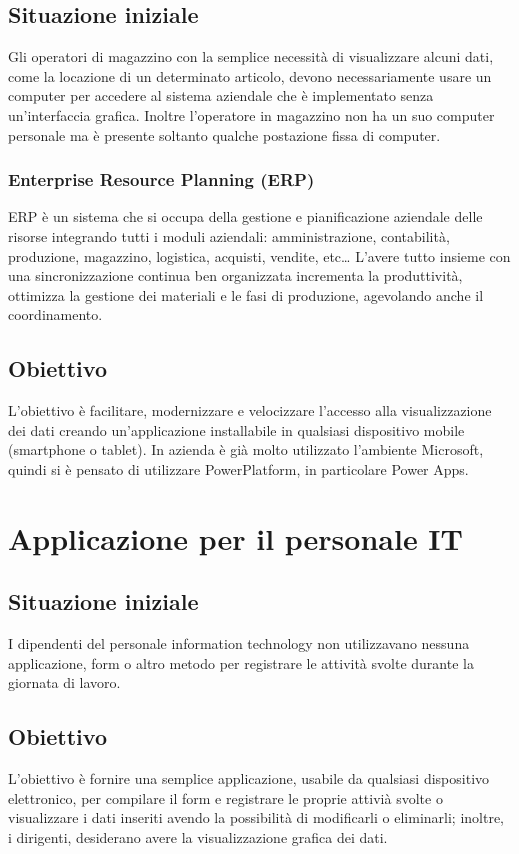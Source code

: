 \subsection{Situazione iniziale}
Gli operatori di magazzino con la semplice necessità di visualizzare alcuni dati, come la locazione di un determinato articolo, devono necessariamente usare un computer per accedere al sistema aziendale  che è implementato senza un’interfaccia grafica. 
Inoltre l’operatore in magazzino non ha un suo computer personale ma è presente soltanto qualche postazione fissa di computer.
\subsubsection{Enterprise Resource Planning (ERP)}
ERP è un sistema che si occupa della gestione e pianificazione aziendale delle risorse integrando tutti i moduli aziendali: amministrazione, contabilità, produzione, magazzino, logistica, acquisti, vendite, etc…
L’avere tutto insieme con una sincronizzazione continua ben organizzata incrementa la produttività, ottimizza la gestione dei materiali e le fasi di produzione, agevolando anche il coordinamento.

\subsection{Obiettivo}
L'obiettivo è facilitare, modernizzare e velocizzare l’accesso alla visualizzazione dei dati creando un’applicazione installabile in qualsiasi dispositivo mobile (smartphone o tablet). 
In azienda è già molto utilizzato l’ambiente Microsoft, quindi si è pensato di utilizzare PowerPlatform, in particolare Power Apps.


\section{Applicazione per il personale IT}
\subsection{Situazione iniziale}
I dipendenti del personale information technology non utilizzavano nessuna applicazione, form o altro metodo per registrare le attività svolte durante la giornata di lavoro.
\subsection{Obiettivo}
L'obiettivo è fornire una semplice applicazione, usabile da qualsiasi dispositivo elettronico, per compilare il form e registrare le proprie attivià svolte o visualizzare i dati inseriti avendo la possibilità di modificarli o eliminarli; inoltre, i dirigenti, desiderano avere la visualizzazione grafica dei dati.


